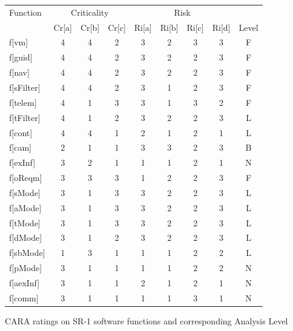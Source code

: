 \documentclass[twocolumn]{styles/IEEEtran}
\begin{document}
\begin{figure}[h]
 \begin{footnotesize} 
 \begin{center}
 \begin{tabular}[t]{|l|c@{ }c@{ }c@{ }|c@{ }c@{ }c@{ }c|c|} \hline
 Function & \multicolumn{3}{|c|}{Criticality} & \multicolumn{4}{c|}{Risk} & \\ 
 	& Cr[a]  	&  Cr[b] 	 & Cr[c] 	&  Ri[a] 	& Ri[b] 	& Ri[c] 	& Ri[d] & Level \\ \hline
f[vm]	&4	&4	&2	&3	&2	&3	&3	&F \\
f[guid]	&4	&4	&2	&3	&2	&2	&3	&F \\
f[nav]	&4	&4	&2	&3	&2	&2	&3	&F \\
f[sFilter]	&4	&4	&2	&3	&1	&2	&3	&F \\
f[telem]	&4	&1	&3	&3	&1	&3	&2	&F \\
f[tFilter]	&4	&1	&2	&3	&2	&2	&3	&L \\
f[cont]	&4	&4	&1	&2	&1	&2	&1	&L \\
f[cam]	&2	&1	&1	&3	&3	&2	&3	&B \\
f[exInf]	&3	&2	&1	&1	&1	&2	&1	&N \\
f[oReqm]	&3	&3	&3	&1	&2	&2	&3	&F \\
f[sMode]	&3	&1	&3	&3	&2	&2	&3	&L \\
f[aMode]	&3	&1	&3	&3	&2	&2	&3	&L \\
f[tMode]	&3	&1	&3	&3	&2	&2	&3	&L \\
f[dMode]	&3	&1	&2	&3	&2	&2	&3	&L \\
f[sbMode]	&1	&3	&1	&1	&1	&2	&2	&L \\
f[pMode]	&3	&1	&1	&1	&1	&2	&2	&N \\
f[aexInf]	&3	&1	&1	&2	&1	&2	&1	&N \\
f[comm]	&3	&1	&1	&1	&1	&3	&1	&N \\  \hline
 \end{tabular}
 \end{center}
 \end{footnotesize}
 \caption{CARA ratings on SR-1 software functions and corresponding Analysis Level}
 \label{fig:cara_result}

\end{figure}

\newpage
\end{document}
